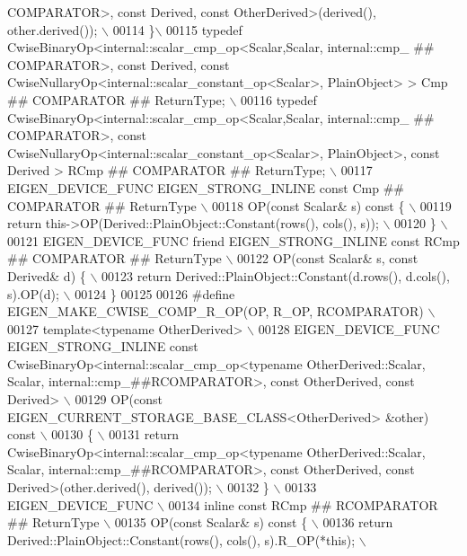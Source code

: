\begin{DoxyCode}
{       COMPARATOR>, const Derived, const OtherDerived>(derived(), other.derived()); \(\backslash\)}
00114 \textcolor{preprocessor}{\}\(\backslash\)}
00115 \textcolor{preprocessor}{typedef CwiseBinaryOp<internal::scalar\_cmp\_op<Scalar,Scalar, internal::cmp\_ ## COMPARATOR>, const Derived,
       const CwiseNullaryOp<internal::scalar\_constant\_op<Scalar>, PlainObject> > Cmp ## COMPARATOR ## ReturnType; \(\backslash\)}
00116 \textcolor{preprocessor}{typedef CwiseBinaryOp<internal::scalar\_cmp\_op<Scalar,Scalar, internal::cmp\_ ## COMPARATOR>, const
       CwiseNullaryOp<internal::scalar\_constant\_op<Scalar>, PlainObject>, const Derived > RCmp ## COMPARATOR ## ReturnType; 
      \(\backslash\)}
00117 \textcolor{preprocessor}{EIGEN\_DEVICE\_FUNC EIGEN\_STRONG\_INLINE const Cmp ## COMPARATOR ## ReturnType \(\backslash\)}
00118 \textcolor{preprocessor}{OP(const Scalar& s) const \{ \(\backslash\)}
00119 \textcolor{preprocessor}{  return this->OP(Derived::PlainObject::Constant(rows(), cols(), s)); \(\backslash\)}
00120 \textcolor{preprocessor}{\} \(\backslash\)}
00121 \textcolor{preprocessor}{EIGEN\_DEVICE\_FUNC friend EIGEN\_STRONG\_INLINE const RCmp ## COMPARATOR ## ReturnType \(\backslash\)}
00122 \textcolor{preprocessor}{OP(const Scalar& s, const Derived& d) \{ \(\backslash\)}
00123 \textcolor{preprocessor}{  return Derived::PlainObject::Constant(d.rows(), d.cols(), s).OP(d); \(\backslash\)}
00124 \textcolor{preprocessor}{\}}
00125 
00126 \textcolor{preprocessor}{#define EIGEN\_MAKE\_CWISE\_COMP\_R\_OP(OP, R\_OP, RCOMPARATOR) \(\backslash\)}
00127 \textcolor{preprocessor}{template<typename OtherDerived> \(\backslash\)}
00128 \textcolor{preprocessor}{EIGEN\_DEVICE\_FUNC EIGEN\_STRONG\_INLINE const CwiseBinaryOp<internal::scalar\_cmp\_op<typename
       OtherDerived::Scalar, Scalar, internal::cmp\_##RCOMPARATOR>, const OtherDerived, const Derived> \(\backslash\)}
00129 \textcolor{preprocessor}{OP(const EIGEN\_CURRENT\_STORAGE\_BASE\_CLASS<OtherDerived> &other) const \(\backslash\)}
00130 \textcolor{preprocessor}{\{ \(\backslash\)}
00131 \textcolor{preprocessor}{  return CwiseBinaryOp<internal::scalar\_cmp\_op<typename OtherDerived::Scalar, Scalar,
       internal::cmp\_##RCOMPARATOR>, const OtherDerived, const Derived>(other.derived(), derived()); \(\backslash\)}
00132 \textcolor{preprocessor}{\} \(\backslash\)}
00133 \textcolor{preprocessor}{EIGEN\_DEVICE\_FUNC \(\backslash\)}
00134 \textcolor{preprocessor}{inline const RCmp ## RCOMPARATOR ## ReturnType \(\backslash\)}
00135 \textcolor{preprocessor}{OP(const Scalar& s) const \{ \(\backslash\)}
00136 \textcolor{preprocessor}{  return Derived::PlainObject::Constant(rows(), cols(), s).R\_OP(*this); \(\backslash\)}

\end{DoxyCode}
